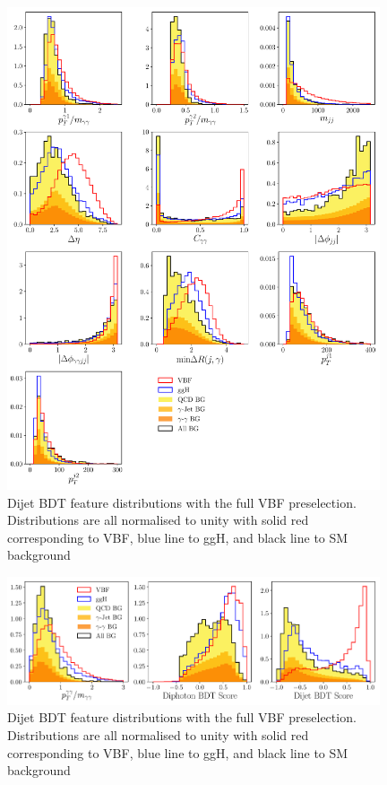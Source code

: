 \begin{figure}[h!]
    \begin{center}
    \includegraphics[width=0.98\textwidth]{figures/appendix_VBFLPS/dijet_BDT_features_splitBG_LPS.pdf}
    \end{center}
    \caption{Dijet BDT feature distributions with the full VBF preselection. Distributions are all normalised to unity with solid red corresponding to VBF, blue line to ggH, and black line to SM background}
    \label{fig:vbf_lps_appendix:dijet_bdt_features}
\end{figure}
%
\begin{figure}[h!]
    \begin{center}
    \includegraphics[width=0.98\textwidth]{figures/appendix_VBFLPS/combined_BDT_features_splitBG_LPS.pdf}
    \end{center}
    \caption{Dijet BDT feature distributions with the full VBF preselection. Distributions are all normalised to unity with solid red corresponding to VBF, blue line to ggH, and black line to SM background}
    \label{fig:vbf_lps_appendix:dijet_bdt_features}
\end{figure}
